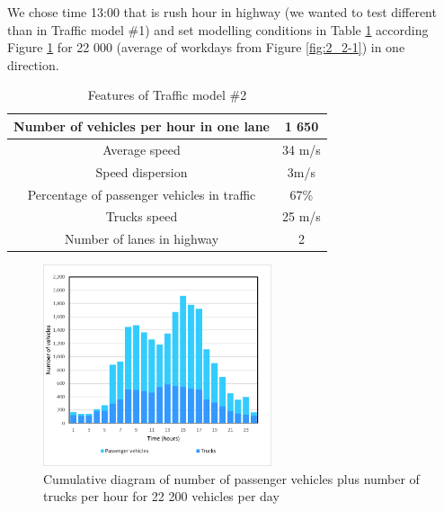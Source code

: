 We chose time 13:00 that is rush hour in highway (we wanted to test different than in Traffic model \#1) and set modelling conditions in Table  \ref{tab:2_5_2-1} according Figure \ref{fig:2_5_2-1} for 22 000 (average of workdays from Figure \ref{fig:2_2-1}) in one direction.

\begin{table}[ph]
\begin{centering}
\begin{tabular}{|c|c|}
\hline 
Number of vehicles per hour in one lane &	1 650\tabularnewline
\hline 
Average speed &	34 m/s\tabularnewline
\hline 
Speed dispersion &	3m/s\tabularnewline
\hline 
Percentage of passenger vehicles in traffic & 	67\%\tabularnewline
\hline 
Trucks speed &	25 m/s\tabularnewline
\hline 
Number of lanes in highway &	2\tabularnewline
\hline 
\end{tabular}
\centering
\protect\caption{\label{tab:2_5_2-1}Features of Traffic model \#2}
\end{centering}
\end{table}

\begin{figure}[ph]
\centering
\includegraphics[width=0.60\textwidth,height=0.60\textheight,keepaspectratio]{figures/Chapter_2/2_Cum_diag_day_22000.png}
\centering
\protect\caption{\label{fig:2_5_2-1}Cumulative diagram of number of passenger vehicles plus number of trucks per hour for 22 200 vehicles per day}
\end{figure}